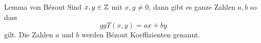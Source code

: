 
\begin{theorem}{Lemma von Bézout}
Sind $x,y\in\mathbb{Z}$ mit $x,y\neq 0$, dann gibt es ganze Zahlen $a,b$ so dass
\[
 ggT(x,y)=ax+by
\]
gilt. Die Zahlen $a$ und $b$ werden Bézout Koeffizienten genannt.
\end{theorem}


